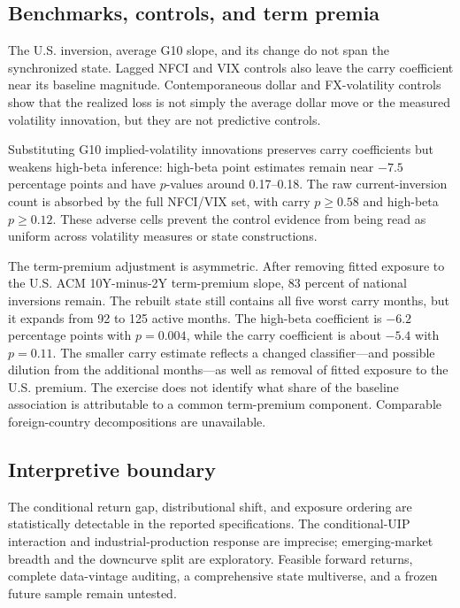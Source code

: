 \subsection{Benchmarks, controls, and term premia}

The U.S. inversion, average G10 slope, and its change do not span the synchronized state. Lagged NFCI and VIX controls also leave the carry coefficient near its baseline magnitude. Contemporaneous dollar and FX-volatility controls show that the realized loss is not simply the average dollar move or the measured volatility innovation, but they are not predictive controls.

Substituting G10 implied-volatility innovations preserves carry coefficients but weakens high-beta inference: high-beta point estimates remain near $-7.5$ percentage points and have $p$-values around 0.17--0.18. The raw current-inversion count is absorbed by the full NFCI/VIX set, with carry $p\geq0.58$ and high-beta $p\geq0.12$. These adverse cells prevent the control evidence from being read as uniform across volatility measures or state constructions.

The term-premium adjustment is asymmetric. After removing fitted exposure to the U.S. ACM 10Y-minus-2Y term-premium slope, 83 percent of national inversions remain. The rebuilt state still contains all five worst carry months, but it expands from 92 to 125 active months. The high-beta coefficient is $-6.2$ percentage points with $p=0.004$, while the carry coefficient is about $-5.4$ with $p=0.11$. The smaller carry estimate reflects a changed classifier---and possible dilution from the additional months---as well as removal of fitted exposure to the U.S. premium. The exercise does not identify what share of the baseline association is attributable to a common term-premium component. Comparable foreign-country decompositions are unavailable.

\subsection{Interpretive boundary}

The conditional return gap, distributional shift, and exposure ordering are statistically detectable in the reported specifications. The conditional-UIP interaction and industrial-production response are imprecise; emerging-market breadth and the downcurve split are exploratory. Feasible forward returns, complete data-vintage auditing, a comprehensive state multiverse, and a frozen future sample remain untested.
